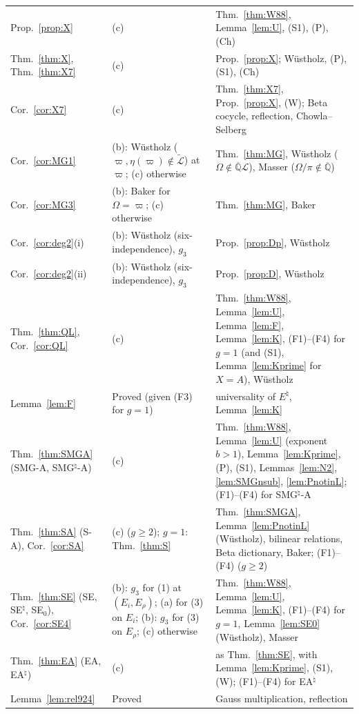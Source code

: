 \documentclass[11pt]{amsart}
\theoremstyle{definition}
\newcommand{\Qb}{\overline{\mathbb{Q}}}
\newcommand{\Lg}{\mathcal{L}}
\newcommand{\Lt}{\widetilde{\mathcal{L}}}
\newcommand{\vp}{\varpi}
\newif\ifformallabels \formallabelstrue
\newcommand{\TierA}{\ifformallabels(a)\else(c)\fi}
\newcommand{\TierB}{\ifformallabels(b)\else(c)\fi}
\begin{document}
{\begin{longtable}{>{\raggedright\arraybackslash}p{3.3cm}>{\raggedright\arraybackslash}p{4.4cm}>{\raggedright\arraybackslash}p{6.2cm}}
Prop.~\ref{prop:X} & (c) & Thm.~\ref{thm:W88}, Lemma~\ref{lem:U}, (S1), (P), (Ch)\\
Thm.~\ref{thm:X}, Thm.~\ref{thm:X7} & (c) & Prop.~\ref{prop:X}; W\"ustholz, (P), (S1), (Ch)\\
Cor.~\ref{cor:X7} & (c) & Thm.~\ref{thm:X7}, Prop.~\ref{prop:X}, (W); Beta cocycle, reflection, Chowla--Selberg\\
Cor.~\ref{cor:MG1} & \TierB: W\"ustholz ($\vp,\eta(\vp)\notin\Lt$) at $\vp$; (c) otherwise & Thm.~\ref{thm:MG}, W\"ustholz ($\Omega\notin\Qb\Lg$), Masser ($\Omega/\pi\notin\Qb$)\\
Cor.~\ref{cor:MG3} & \TierB: Baker for $\Omega=\vp$; (c) otherwise & Thm.~\ref{thm:MG}, Baker\\
Cor.~\ref{cor:deg2}(i) & \TierB: W\"ustholz (six-independence), $g_3$ & Prop.~\ref{prop:Dp}, W\"ustholz\\
Cor.~\ref{cor:deg2}(ii) & \TierB: W\"ustholz (six-independence), $g_3$ & Prop.~\ref{prop:D}, W\"ustholz\\
Thm.~\ref{thm:QL}, Cor.~\ref{cor:QL} & (c) & Thm.~\ref{thm:W88}, Lemma~\ref{lem:U}, Lemma~\ref{lem:F}, Lemma~\ref{lem:K}, (F1)--(F4) for $g=1$ (and (S1), Lemma~\ref{lem:Kprime} for $X=A$), W\"ustholz\\
Lemma~\ref{lem:F} & Proved (given (F3) for $g=1$) & universality of $E^\natural$, Lemma~\ref{lem:K}\\
Thm.~\ref{thm:SMGA} (SMG-A, SMG$^\natural$-A) & (c) & Thm.~\ref{thm:W88}, Lemma~\ref{lem:U} (exponent $b>1$), Lemma~\ref{lem:Kprime}, (P), (S1), Lemmas~\ref{lem:N2}, \ref{lem:SMGnsub}, \ref{lem:PnotinL}; (F1)--(F4) for SMG$^\natural$-A\\
Thm.~\ref{thm:SA} (S-A), Cor.~\ref{cor:SA} & (c) ($g\ge2$); $g=1$: Thm.~\ref{thm:S} & Thm.~\ref{thm:SMGA}, Lemma~\ref{lem:PnotinL} (W\"ustholz), bilinear relations, Beta dictionary, Baker; (F1)--(F4) ($g\ge2$)\\
Thm.~\ref{thm:SE} (SE, SE$^\natural$, SE$_0$), Cor.~\ref{cor:SE4} & \TierB: $g_3$ for (1) at $(E_i,E_\rho)$; \TierA{} for (3) on $E_i$; \TierB: $g_3$ for (3) on $E_\rho$; (c) otherwise & Thm.~\ref{thm:W88}, Lemma~\ref{lem:U}, Lemma~\ref{lem:K}, (F1)--(F4) for $g=1$, Lemma~\ref{lem:SE0} (W\"ustholz), Masser\\
Thm.~\ref{thm:EA} (EA, EA$^\natural$) & (c) & as Thm.~\ref{thm:SE}, with Lemma~\ref{lem:Kprime}, (S1), (W); (F1)--(F4) for EA$^\natural$\\
Lemma~\ref{lem:rel924} & Proved & Gauss multiplication, reflection\\

\end{longtable}}
\end{document}
